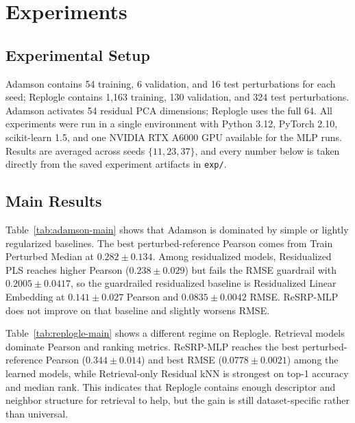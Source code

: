 \documentclass{article}
\begin{document}
\section{Experiments}
\label{sec:experiments}

\subsection{Experimental Setup}

Adamson contains 54 training, 6 validation, and 16 test perturbations for each seed; Replogle contains 1{,}163 training, 130 validation, and 324 test perturbations. Adamson activates 54 residual PCA dimensions; Replogle uses the full 64. All experiments were run in a single environment with Python 3.12, PyTorch 2.10, scikit-learn 1.5, and one NVIDIA RTX A6000 GPU available for the MLP runs. Results are averaged across seeds $\{11,23,37\}$, and every number below is taken directly from the saved experiment artifacts in \texttt{exp/}.

\subsection{Main Results}

Table~\ref{tab:adamson-main} shows that Adamson is dominated by simple or lightly regularized baselines. The best perturbed-reference Pearson comes from Train Perturbed Median at $0.282 \pm 0.134$. Among residualized models, Residualized PLS reaches higher Pearson ($0.238 \pm 0.029$) but fails the RMSE guardrail with $0.2005 \pm 0.0417$, so the guardrailed residualized baseline is Residualized Linear Embedding at $0.141 \pm 0.027$ Pearson and $0.0835 \pm 0.0042$ RMSE. ReSRP-MLP does not improve on that baseline and slightly worsens RMSE.

Table~\ref{tab:replogle-main} shows a different regime on Replogle. Retrieval models dominate Pearson and ranking metrics. ReSRP-MLP reaches the best perturbed-reference Pearson ($0.344 \pm 0.014$) and best RMSE ($0.0778 \pm 0.0021$) among the learned models, while Retrieval-only Residual kNN is strongest on top-1 accuracy and median rank. This indicates that Replogle contains enough descriptor and neighbor structure for retrieval to help, but the gain is still dataset-specific rather than universal.
\end{document}
